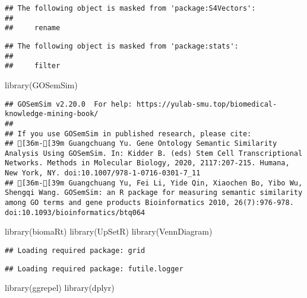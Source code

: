 \documentclass[
]{article}
\newenvironment{Shaded}{\begin{snugshade}}{\end{snugshade}}
\newcommand{\FunctionTok}[1]{\textcolor[rgb]{0.00,0.00,0.00}{#1}}
\newcommand{\NormalTok}[1]{#1}
\begin{document}
\begin{verbatim}
## The following object is masked from 'package:S4Vectors':
## 
##     rename
\end{verbatim}

\begin{verbatim}
## The following object is masked from 'package:stats':
## 
##     filter
\end{verbatim}

\begin{Shaded}
\begin{Highlighting}[]
\FunctionTok{library}\NormalTok{(GOSemSim)}
\end{Highlighting}
\end{Shaded}

\begin{verbatim}
## GOSemSim v2.20.0  For help: https://yulab-smu.top/biomedical-knowledge-mining-book/
## 
## If you use GOSemSim in published research, please cite:
## [36m-[39m Guangchuang Yu. Gene Ontology Semantic Similarity Analysis Using GOSemSim. In: Kidder B. (eds) Stem Cell Transcriptional Networks. Methods in Molecular Biology, 2020, 2117:207-215. Humana, New York, NY. doi:10.1007/978-1-0716-0301-7_11
## [36m-[39m Guangchuang Yu, Fei Li, Yide Qin, Xiaochen Bo, Yibo Wu, Shengqi Wang. GOSemSim: an R package for measuring semantic similarity among GO terms and gene products Bioinformatics 2010, 26(7):976-978. doi:10.1093/bioinformatics/btq064
\end{verbatim}

\begin{Shaded}
\begin{Highlighting}[]
\FunctionTok{library}\NormalTok{(biomaRt)}
\FunctionTok{library}\NormalTok{(UpSetR)}
\FunctionTok{library}\NormalTok{(VennDiagram)}
\end{Highlighting}
\end{Shaded}

\begin{verbatim}
## Loading required package: grid
\end{verbatim}

\begin{verbatim}
## Loading required package: futile.logger
\end{verbatim}

\begin{Shaded}
\begin{Highlighting}[]
\FunctionTok{library}\NormalTok{(ggrepel)}
\FunctionTok{library}\NormalTok{(dplyr)}
\end{Highlighting}
\end{Shaded}
\end{document}
